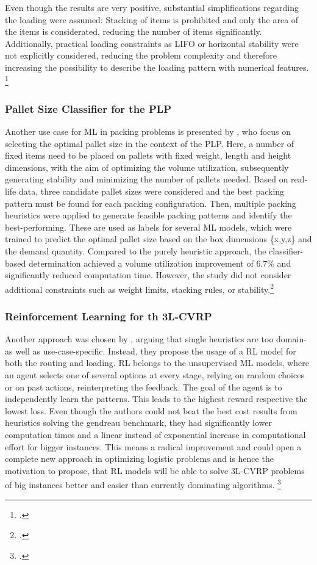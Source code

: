 Even though the results are very positive, substantial simplifications regarding the loading were assumed: Stacking
of items is prohibited and only the area of the items is considerated, reducing the number of items significantly.
Additionally, practical loading constraints as \gls{LIFO} or horizontal stability
were not explicitly considered, reducing the problem complexity and therefore increasing the possibility to describe
the loading pattern with numerical features. \footcite[cf.][]{zhang_learning-based_2022}

\subsubsection{Pallet Size Classifier for the \gls{PLP}}
Another use case for \gls{ML} in packing problems is presented by \textcite{aylak_application_2021},
who focus on selecting the optimal pallet size in the context of the \gls{PLP}. Here, a number of fixed items
need to be placed on pallets with fixed weight, length and height dimensions, with the aim of optimizing the volume utilization,
subsequently generating stability and minimizing the number of pallets needed. Based on real-life data,
three candidate pallet sizes were considered and the best packing pattern must be found for each packing
configuration. Then, multiple packing heuristics were applied to
generate feasible packing patterns and identify the best-performing. These are used as labels for several
\gls{ML} models, which were trained to predict the optimal pallet size based on the box
dimensions \{x,y,z\} and the demand quantity. Compared to the purely heuristic approach, the classifier-based
determination achieved a volume utilization improvement of $6.7\%$ and significantly reduced computation time.
However, the study did not consider additional constraints such as weight limits, stacking rules, or stability.\footcite[cf.][pp. 12--14]{aylak_application_2021}

\subsubsection{Reinforcement Learning for th \gls{3L-CVRP}}
Another approach was chosen by \cite{schoepf_using_2024}, arguing that single heuristics are too domain- as well as use-case-specific.
Instead, they propose the usage of a \gls{RL} model for both the routing and loading. \gls{RL} belongs
to the unsupervised \gls{ML} models, where an agent selects one of several options at every stage, relying on random choices or
on past actions, reinterpreting the feedback. The goal of the agent is to independently learn
the patterns. This leads to the highest reward respective the lowest loss. Even though the authors could not beat
the best cost results from heuristics solving the gendreau benchmark, they had significantly lower computation times and
a linear instead of exponential increase in computational effort for bigger instances. This means a radical improvement
and could open a complete new approach in optimizing logistic problems and is hence the motivation to propose, that \gls{RL}
models will be able to solve \gls{3L-CVRP} problems of big instances better and easier than currently dominating
algorithms. \footcite[cf.][]{schoepf_using_2024}

